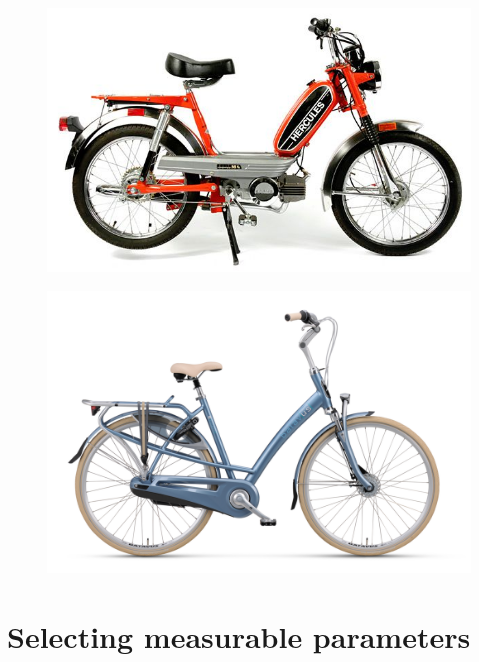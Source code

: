\documentclass[a4paper]{article}
\begin{document}
\begin{figure}[h]
\centering
\begin{minipage}{.5\textwidth}
  \centering
  \includegraphics[height=.6\linewidth]{moped.jpg}
  \label{fig:moped}
\end{minipage}%
\begin{minipage}{.5\textwidth}
  \centering
  \includegraphics[height=.6\linewidth]{bicycle.jpg}
  \label{fig:bicycle}
\end{minipage}
\end{figure}

\section{Selecting measurable parameters}
\label{sec:selecting}
\end{document}
